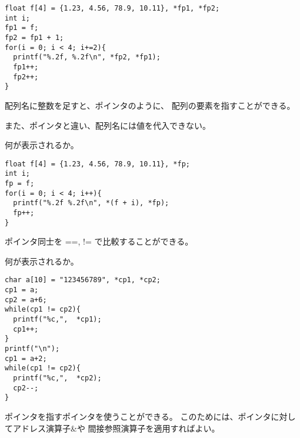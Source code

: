 \documentclass[12pt,a4j]{jarticle}
\newcounter{toi}
\def\toi{%
\bigskip\bigskip\noindent
\addtocounter{toi}{1}
\shadowbox{\bfseries\large 問\thetoi}
\nopagebreak[4]\bigskip\nopagebreak[4]
}
\begin{document}
\begin{verbatim}
float f[4] = {1.23, 4.56, 78.9, 10.11}, *fp1, *fp2;
int i;
fp1 = f;
fp2 = fp1 + 1;
for(i = 0; i < 4; i+=2){
  printf("%.2f, %.2f\n", *fp2, *fp1);
  fp1++;
  fp2++;
}
\end{verbatim}



\toi

配列名に整数を足すと、ポインタのように、
配列の要素を指すことができる。


また、ポインタと違い、配列名には値を代入できない。



何が表示されるか。

\begin{verbatim}
float f[4] = {1.23, 4.56, 78.9, 10.11}, *fp;
int i;
fp = f;
for(i = 0; i < 4; i++){
  printf("%.2f %.2f\n", *(f + i), *fp);
  fp++;
}
\end{verbatim}





\toi

ポインタ同士を {\ttfamily ==, !=} で比較することができる。

何が表示されるか。

\begin{verbatim}
char a[10] = "123456789", *cp1, *cp2;
cp1 = a;
cp2 = a+6;
while(cp1 != cp2){
  printf("%c,",  *cp1);
  cp1++;
}
printf("\n");
cp1 = a+2;
while(cp1 != cp2){
  printf("%c,",  *cp2);
  cp2--;
}
\end{verbatim}




\toi

ポインタを指すポインタを使うことができる。
このためには、ポインタに対してアドレス演算子{\ttfamily \&}や
間接参照演算子{\ttfamily *}を適用すればよい。
\end{document}
